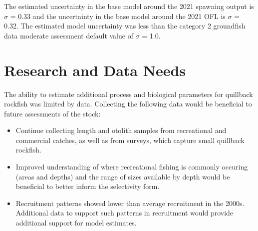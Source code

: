 \documentclass[11pt,
  english,
  a4paper,
]{article}
\begin{document}
\leavevmode\tagmcend\tagstructend


The estimated uncertainty in the base model around the 2021 spawning output is {\(\sigma\)\leavevmode\tagmcend\tagstructend} = 0.33 and the uncertainty in the base model around the 2021 OFL is {\(\sigma\)\leavevmode\tagmcend\tagstructend} = 0.32. The estimated model uncertainty was less than the category 2 groundfish data moderate assessment default value of {\(\sigma\)\leavevmode\tagmcend\tagstructend} = 1.0.

\leavevmode\tagmcend\tagstructend\par


\hypertarget{research-and-data-needs}{%
\section{Research and Data Needs}\label{research-and-data-needs}}

\leavevmode\tagmcend\tagstructend


The ability to estimate additional process and biological parameters for quillback rockfish was limited by data. Collecting the following data would be beneficial to future assessments of the stock:

\leavevmode\tagmcend\tagstructend\par

\begin{itemize}

    \item Continue collecting length and otolith samples from recreational and commercial catches, as well as from surveys, which capture small quillback rockfish.

    \item Improved understanding of where recreational fishing is commonly occuring (areas and depths) and the range of sizes available by depth would be beneficial to better inform the selectivity form.  
    
    \item Recruitment patterns showed lower than average recruitment in the 2000s. Additional data to support such patterns in recruitment would provide additional support for model estimates.  
    
\end{itemize}
\end{document}
